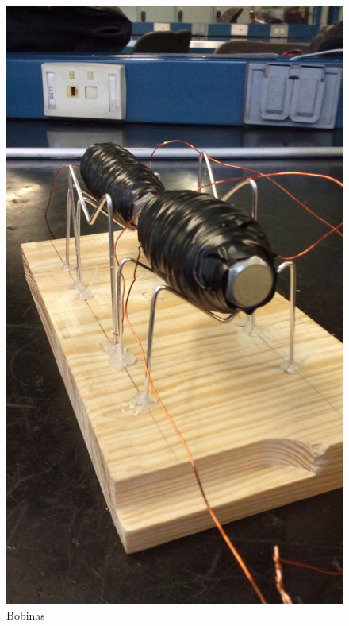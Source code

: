 \begin{figure}[!htbp]
\caption{Bobinas}
\centering
\includegraphics [scale=0.10]
{./img/20160301_135006.jpg}
\end{figure}

